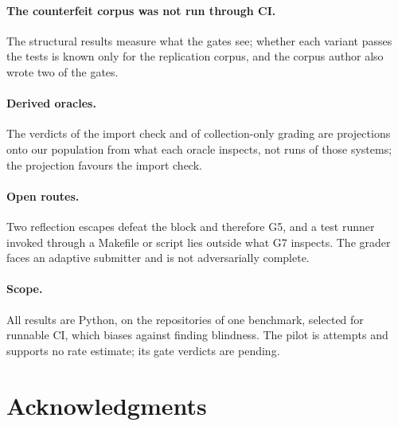 \documentclass[11pt]{article}
\newif\ifdraft
\newcommand{\todo}[1]{\ifdraft\textcolor{red}{\textbf{[TODO: #1]}}\fi}
\begin{document}
\paragraph{The counterfeit corpus was not run through CI.}
The structural results measure what the gates see; whether each variant passes the tests is known only for the replication corpus, and the corpus author also wrote two of the gates.
\todo{State the corpus and reference provenance once the authors confirm it.}

\paragraph{Derived oracles.}
The verdicts of the import check and of collection-only grading are projections onto our population from what each oracle inspects, not runs of those systems; the projection favours the import check.

\paragraph{Open routes.}
Two reflection escapes defeat the block and therefore G5, and a test runner invoked through a Makefile or script lies outside what G7 inspects.
The grader faces an adaptive submitter and is not adversarially complete.

\paragraph{Scope.}
All results are Python, on the repositories of one benchmark, selected for runnable CI, which biases against finding blindness.
The pilot is \nAgentAttempts{} attempts and supports no rate estimate; its gate verdicts are pending.

\section*{Acknowledgments}

\todo{acknowledgments}



\appendix
\end{document}

